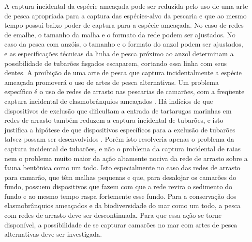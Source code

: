 \documentclass[a4paper,11pt,twoside,showtrims,onecolumn,openright,final]{memoir}
\begin{document}
A captura incidental da espécie ameaçada pode ser reduzida pelo uso de uma arte de pesca 
apropriada para a captura das espécies-alvo da pescaria e que ao mesmo tempo possui baixo poder 
de captura para a espécie ameaçada. No caso de redes de emalhe, o tamanho da malha e o formato da 
rede podem ser ajustados.  No caso da pesca com anzóis, o tamanho e o formato do anzol podem ser ajustados, 
e  as especificações técnicas da linha de pesca próximo ao anzol determinam a possibilidade de tubarões 
fisgados escaparem,  cortando essa linha com seus dentes. A proibição de uma arte de pesca que captura 
incidentalmente a espécie ameaçada promoverá o uso de artes de pesca alternativas. 
Um problema específico é o uso de redes de arrasto nas pescarias de camarões, com a freqüente 
captura incidental de elasmobrânquios ameaçados \citep{stone1998}. %
Há indícios de que dispositivos de exclusão que dificultam a entrada de tartarugas marinhas 
em redes de arrasto também reduzem a captura incidental de tubarões, e isto justifica a hipótese de que 
dispositivos específicos para a exclusão de tubarões talvez possam ser 
desenvolvidos \citep{stone1998,walker2004}. %
Porém isto resolveria apenas o problema da captura incidental de tubarões, e não o problema 
da captura incidental de raias nem o problema muito maior da ação altamente nociva da rede de 
arrasto sobre a fauna bentônica como um todo. Isto especialmente no caso das redes de arrasto 
para camarão, que têm malhas pequenas e que, para desalojar os camarões do fundo, possuem dispositivos 
que fazem com que a rede revira o sedimento do fundo e ao mesmo tempo raspa fortemente esse fundo. 
Para a conservação dos elasmobrânquios ameaçados e da biodiversidade do mar como um todo, 
a pesca com redes de arrasto deve ser descontinuada. Para que essa ação se torne disponível, 
a possibilidade de se capturar camarões no mar com artes de pesca alternativas deve ser  investigada.
\end{document}
